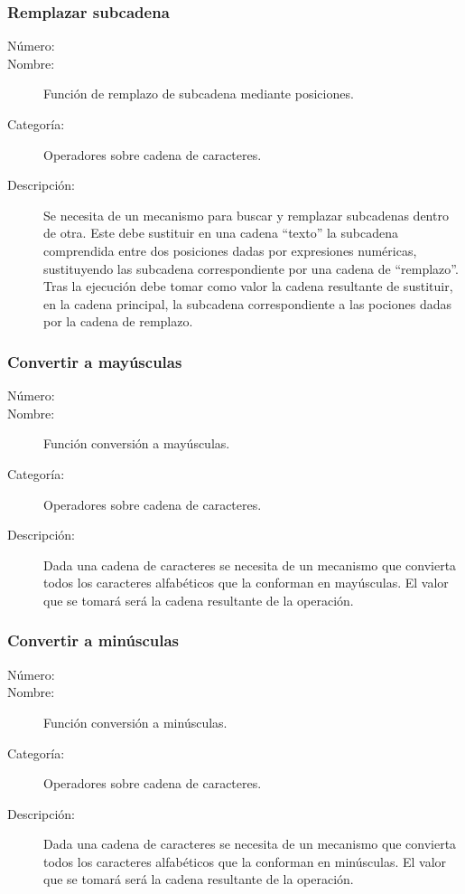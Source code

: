 \subsubsection{Remplazar subcadena}
	\begin{description}
		\item [Número:] \cn
		\item [Nombre:] Función de remplazo de subcadena mediante posiciones.
		\item [Categoría:] Operadores sobre cadena de caracteres.
		\item [Descripción:] Se necesita de un mecanismo para buscar y remplazar subcadenas dentro de otra.
		Este debe sustituir en una cadena ``texto'' la subcadena comprendida entre dos posiciones dadas por 
      expresiones numéricas, sustituyendo las subcadena correspondiente por una cadena de ``remplazo''. 
      Tras la ejecución debe tomar como valor la cadena
		resultante de sustituir, en la cadena principal, la subcadena correspondiente a las pociones dadas por la cadena de remplazo.
      
	\end {description}

\subsubsection{Convertir a mayúsculas}
	\begin{description}
		\item [Número:] \cn
		\item [Nombre:] Función conversión a mayúsculas.
		\item [Categoría:] Operadores sobre cadena de caracteres.
		\item [Descripción:] Dada una cadena de caracteres se necesita de un mecanismo que convierta todos los caracteres
		alfabéticos que la conforman en mayúsculas. El valor que se tomará será la cadena resultante de la operación.
	\end {description}

\subsubsection{Convertir a minúsculas}
	\begin{description}
		\item [Número:] \cn
		\item [Nombre:] Función conversión a minúsculas.
		\item [Categoría:] Operadores sobre cadena de caracteres.
		\item [Descripción:] Dada una cadena de caracteres se necesita de un mecanismo que convierta todos los caracteres
		alfabéticos que la conforman en minúsculas. El valor que se tomará será la cadena resultante de la operación.
	\end {description}
